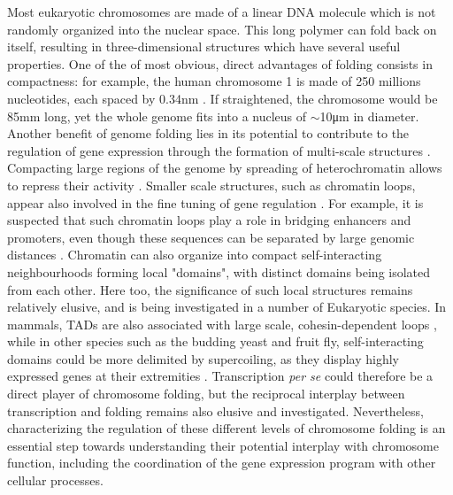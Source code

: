 Most eukaryotic chromosomes are made of a linear DNA molecule which is not randomly organized into the nuclear space. This long polymer can fold back on itself, resulting in three-dimensional structures which have several useful properties. One of the of most obvious, direct advantages of folding consists in compactness: for example, the human chromosome 1 is made of 250 millions nucleotides, each spaced by 0.34\si{\nano\meter} \cite {langridgeMolecularConfigurationDeoxyribonucleic1960}. If straightened, the chromosome would be 85\si{\milli\meter} long, yet the whole genome fits into a nucleus of $\sim$10\si{\micro\meter} in diameter. Another benefit of genome folding lies in its potential to contribute to the regulation of gene expression through the formation of multi-scale structures \cite{bonevOrganizationFunction3D2016}. Compacting large regions of the genome by spreading of \Gls{heterochromatin} allows to repress their activity \cite{gilbertChromatinArchitectureHuman2004}. Smaller scale structures, such as chromatin loops, appear also involved in the fine tuning of gene regulation \cite{bonevOrganizationFunction3D2016}. For example, it is suspected that such \Gls{chromatin} loops play a role in bridging enhancers and promoters, even though these sequences can be separated by large genomic distances \cite{doyleChromatinLoopsAllosteric2014,dowenMultipleStructuralMaintenance2013,dorsettCohesinActiveGenes2013}. Chromatin can also organize into compact self-interacting neighbourhoods forming local "domains", with distinct domains being isolated from each other. Here too, the significance of such local structures remains relatively elusive, and is being investigated in a number of Eukaryotic species. In mammals, \acrfull{TAD}s are also associated with large scale, cohesin-dependent loops \cite{ji3DChromosomeRegulatory2016}, while in other species such as the budding yeast and fruit fly, self-interacting domains could be more delimited by supercoiling, as they display highly expressed genes at their extremities \cite{hsiehMappingNucleosomeResolution2015,chathothChromatinArchitectureReorganization2019}. Transcription \textit{per se} could therefore be a direct player of chromosome folding, but the reciprocal interplay between transcription and folding remains also elusive and investigated. Nevertheless, characterizing the regulation of these different levels of chromosome folding is an essential step towards understanding their potential interplay with chromosome function, including the coordination of the gene expression program with other cellular processes.

